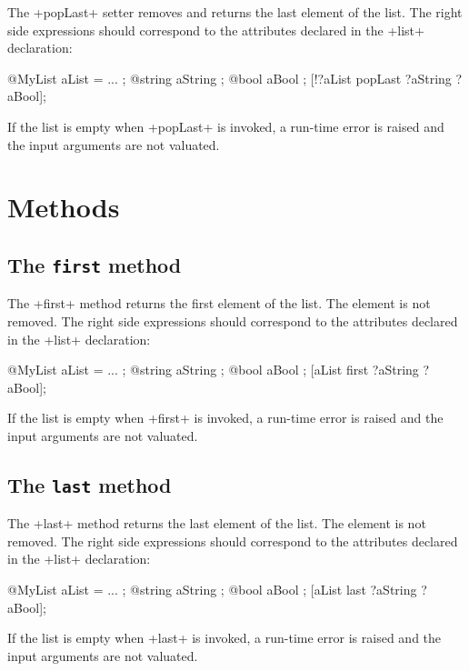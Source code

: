 The \ggs+popLast+ setter removes and returns the last element of the list. The right side expressions should correspond to the attributes declared in the \ggs+list+ declaration:

\begin{galgas}
@MyList aList = ... ;
@string aString ;
@bool aBool ;
[!?aList popLast ?aString ?aBool];
\end{galgas}

If the list is empty when \ggs+popLast+ is invoked, a run-time error is raised and the input arguments are not valuated.

\section{Methods}

\subsection{The \texttt{first} method}

The \ggs+first+ method returns the first element of the list. The element is not removed. The right side expressions should correspond to the attributes declared in the \ggs+list+ declaration:

\begin{galgas}
@MyList aList = ... ;
@string aString ;
@bool aBool ;
[aList first ?aString ?aBool];
\end{galgas}

If the list is empty when \ggs+first+ is invoked, a run-time error is raised and the input arguments are not valuated.

\subsection{The \texttt{last} method}

The \ggs+last+ method returns the last element of the list. The element is not removed. The right side expressions should correspond to the attributes declared in the \ggs+list+ declaration:\\

\begin{galgas}
@MyList aList = ... ;
@string aString ;
@bool aBool ;
[aList last ?aString ?aBool];
\end{galgas}


If the list is empty when \ggs+last+ is invoked, a run-time error is raised and the input arguments are not valuated.








